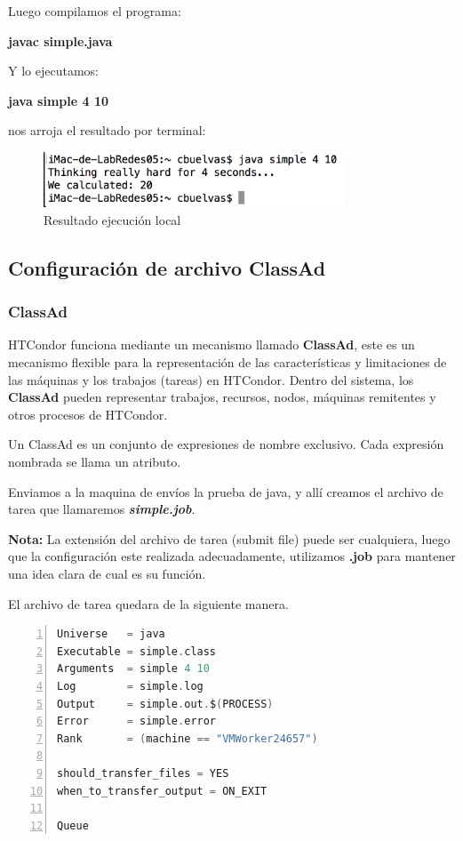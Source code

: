 Luego compilamos el programa:

\textbf{javac simple.java}

Y lo ejecutamos:

\textbf{java simple 4 10}

nos arroja el resultado por terminal:

\begin{figure}[h]
\centering
\includegraphics[width=0.8\textwidth]{images/resulttest.png}
\decoRule
\caption{Resultado ejecución local}
\label{fig:java test}
\end{figure}
\FloatBarrier

\subsection{Configuración de archivo ClassAd}

\subsubsection*{ClassAd}

HTCondor funciona mediante un mecanismo llamado \textbf{ClassAd},  este es un mecanismo flexible para la representación de las características y limitaciones de las máquinas y los trabajos (tareas) en HTCondor.
Dentro del sistema, los \textbf{ClassAd} pueden representar trabajos, recursos, nodos, máquinas remitentes y otros procesos de HTCondor.

Un ClassAd es un conjunto de expresiones de nombre exclusivo. Cada expresión nombrada se llama un atributo.

Enviamos a la maquina de envíos la prueba de java, y allí creamos el archivo de tarea que llamaremos \textbf{\textit{simple.job}}.

\textbf{Nota:} La extensión del archivo de tarea (submit file) puede ser cualquiera, luego que la configuración este realizada adecuadamente, utilizamos \textbf{.job} para mantener una idea clara de cual es su función.

El archivo de tarea quedara de la siguiente  manera.

\begin{lstlisting}[frame=single,
  basicstyle=\footnotesize\ttfamily,
  language=C, 
  numbers=left, 
  numberstyle=\tiny\color{black},
  captionpos=b]
Universe   = java
Executable = simple.class
Arguments  = simple 4 10
Log        = simple.log
Output     = simple.out.$(PROCESS)
Error      = simple.error
Rank       = (machine == "VMWorker24657")

should_transfer_files = YES
when_to_transfer_output = ON_EXIT

Queue 
\end{lstlisting}
  

